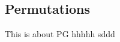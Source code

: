 \documentclass[a4paper,11pt]{article}
\begin{document}
\else %
\fi



\subsection{Permutations}
This is about PG
hhhhh sddd



\ifx\ChapTwoSecTwo\undefined
     
\end{document}
